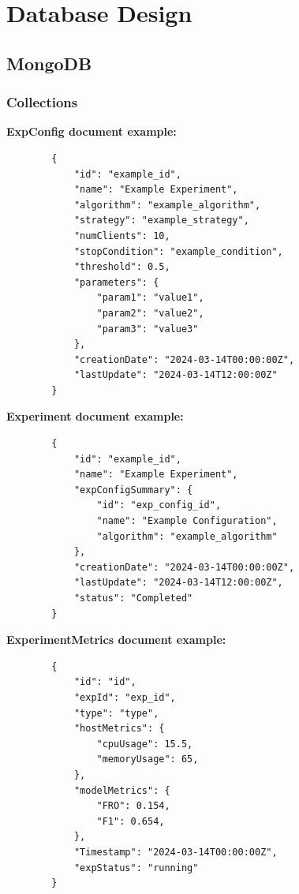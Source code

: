 \newpage
\section{Database Design}

\subsection{MongoDB}
\subsubsection{Collections}
\textbf{ExpConfig document example:} \begin{verbatim}
        {
            "id": "example_id",
            "name": "Example Experiment",
            "algorithm": "example_algorithm",
            "strategy": "example_strategy",
            "numClients": 10,
            "stopCondition": "example_condition",
            "threshold": 0.5,
            "parameters": {
                "param1": "value1",
                "param2": "value2",
                "param3": "value3"
            },
            "creationDate": "2024-03-14T00:00:00Z",
            "lastUpdate": "2024-03-14T12:00:00Z"
        }
    \end{verbatim}
\textbf{Experiment document example:} \begin{verbatim}
        {
            "id": "example_id",
            "name": "Example Experiment",
            "expConfigSummary": {
                "id": "exp_config_id",
                "name": "Example Configuration",
                "algorithm": "example_algorithm"
            },
            "creationDate": "2024-03-14T00:00:00Z",
            "lastUpdate": "2024-03-14T12:00:00Z",
            "status": "Completed"
        }
    \end{verbatim}

    \textbf{ExperimentMetrics document example:} \begin{verbatim}
        {
            "id": "id",
            "expId": "exp_id",
            "type": "type",
            "hostMetrics": {
                "cpuUsage": 15.5,
                "memoryUsage": 65,
            },
            "modelMetrics": {
                "FRO": 0.154,
                "F1": 0.654,
            },
            "Timestamp": "2024-03-14T00:00:00Z",
            "expStatus": "running"
        }
    \end{verbatim}

